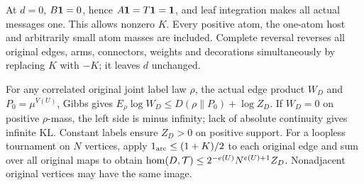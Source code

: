 At \(d=0\), \(B\mathbf1=0\), hence \(A\mathbf1=T\mathbf1=\mathbf1\), and leaf integration makes all actual messages one. This allows nonzero \(K\). Every positive atom, the one-atom host and arbitrarily small atom masses are included. Complete reversal reverses all original edges, arms, connectors, weights and decorations simultaneously by replacing \(K\) with \(-K\); it leaves \(d\) unchanged.

For any correlated original joint label law \(\rho\), the actual edge product \(W_D\) and \(P_0=\mu^{V(U)}\), Gibbs gives \(E_\rho\log W_D\le D(\rho\|P_0)+\log Z_D\).  If \(W_D=0\) on positive \(\rho\)-mass, the left side is minus infinity; lack of absolute continuity gives infinite KL. Constant labels ensure \(Z_D>0\) on positive support. For a loopless tournament on \(N\) vertices, apply \(1_{\rm arc}\le(1+K)/2\) to each original edge and sum over all original maps to obtain \(\operatorname{hom}(D,\allowbreak \allowbreak  \mathcal T)\le2^{-e(U)}N^{e(U)+1}Z_D\). Nonadjacent original vertices may have the same image.
